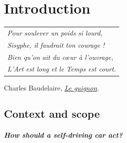 
\graphicspath{{2-Chapters/1-Chapter/}}

\chapter{Introduction}
\label{chapter:1}

\begin{flushright}
	\begin{tabular}{@{}l@{}}
		\emph{Pour soulever un poids si lourd,}\\
		\emph{Sisyphe, il faudrait ton courage !}\\
		\emph{Bien qu’on ait du cœur à l’ouvrage,}\\
		\emph{L’Art est long et le Temps est court.}\\
	\end{tabular}

	Charles Baudelaire, \href{https://eleurent.github.io/sisyphe/texts/le-guignon.html}{\emph{Le guignon}}.
\end{flushright}

\section{Context and scope}


\paragraph{How should a self-driving car act?}

